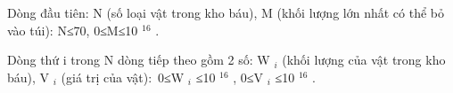 Dòng đầu tiên: N (số loại vật trong kho báu), M (khối lượng lớn nhất có thể bỏ vào túi): N≤70, 0≤M≤10 $^ 16 $ .

Dòng thứ i trong N dòng tiếp theo gồm 2 số: W $_ i $ (khối lượng của vật trong kho báu), V $_ i $ (giá trị của vật): 0≤W $_ i $ ≤10 $^ 16 $ , 0≤V $_ i $ ≤10 $^ 16 $ .

\